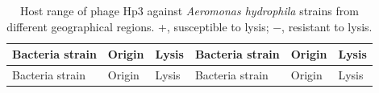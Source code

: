 \begin{longtable}[]{@{}
  >{\raggedright\arraybackslash}p{}
  >{\raggedright\arraybackslash}p{}
  >{\centering\arraybackslash}p{}
  >{\raggedright\arraybackslash}p{}
  >{\raggedright\arraybackslash}p{}
  >{\centering\arraybackslash}p{}@{}}
\caption{Host range of phage Hp3 against \emph{Aeromonas hydrophila}
strains from different geographical regions. +, susceptible to lysis; −,
resistant to lysis.}\label{tbl-host-range}\tabularnewline
\toprule\noalign{}
\begin{minipage}[b]{\linewidth}\raggedright
Bacteria strain
\end{minipage} & \begin{minipage}[b]{\linewidth}\raggedright
Origin
\end{minipage} & \begin{minipage}[b]{\linewidth}\centering
Lysis
\end{minipage} & \begin{minipage}[b]{\linewidth}\raggedright
Bacteria strain
\end{minipage} & \begin{minipage}[b]{\linewidth}\raggedright
Origin
\end{minipage} & \begin{minipage}[b]{\linewidth}\centering
Lysis
\end{minipage} \\
\midrule\noalign{}
\endfirsthead
\toprule\noalign{}
\begin{minipage}[b]{\linewidth}\raggedright
Bacteria strain
\end{minipage} & \begin{minipage}[b]{\linewidth}\raggedright
Origin
\end{minipage} & \begin{minipage}[b]{\linewidth}\centering
Lysis
\end{minipage} & \begin{minipage}[b]{\linewidth}\raggedright
Bacteria strain
\end{minipage} & \begin{minipage}[b]{\linewidth}\raggedright
Origin
\end{minipage} & \begin{minipage}[b]{\linewidth}\centering
Lysis
\end{minipage} \\

\end{longtable}
